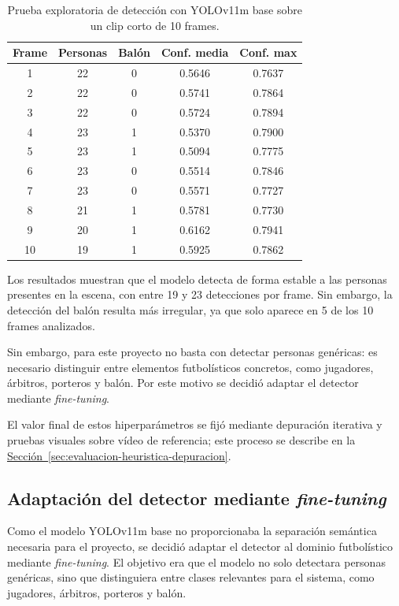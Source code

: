 \begin{table}[H]
	\centering
	\begin{tabular}{c|c|c|c|c}
		\textbf{Frame} & \textbf{Personas} & \textbf{Balón} & \textbf{Conf. media} & \textbf{Conf. max} \\
		\hline\hline
		1 & 22 & 0 & 0.5646 & 0.7637 \\
		2 & 22 & 0 & 0.5741 & 0.7864 \\
		3 & 22 & 0 & 0.5724 & 0.7894 \\
		4 & 23 & 1 & 0.5370 & 0.7900 \\
		5 & 23 & 1 & 0.5094 & 0.7775 \\
		6 & 23 & 0 & 0.5514 & 0.7846 \\
		7 & 23 & 0 & 0.5571 & 0.7727 \\
		8 & 21 & 1 & 0.5781 & 0.7730 \\
		9 & 20 & 1 & 0.6162 & 0.7941 \\
		10 & 19 & 1 & 0.5925 & 0.7862 \\
		\hline
	\end{tabular}
	\caption[Prueba exploratoria de detección con YOLOv11m]{Prueba exploratoria de detección con YOLOv11m base sobre un clip corto de 10 frames.}
	\label{tab:yolo11mBaseFrame}
\end{table}

Los resultados muestran que el modelo detecta de forma estable a las personas presentes en la escena, con entre 19 y 23 detecciones por frame. Sin embargo, la detección del balón resulta más irregular, ya que solo aparece en 5 de los 10 frames analizados.

Sin embargo, para este proyecto no basta con detectar personas genéricas: es necesario distinguir entre elementos futbolísticos concretos, como jugadores, árbitros, porteros y balón. Por este motivo se decidió adaptar el detector mediante \textit{fine-tuning}.

El valor final de estos hiperparámetros se fijó mediante depuración iterativa y pruebas visuales sobre vídeo de referencia; este proceso se describe en la \hyperref[sec:evaluacion-heuristica-depuracion]{Sección~\ref*{sec:evaluacion-heuristica-depuracion}}.

\subsection{Adaptación del detector mediante \textit{fine-tuning}}
Como el modelo YOLOv11m base no proporcionaba la separación semántica necesaria para el proyecto, se decidió adaptar el detector al dominio futbolístico mediante \textit{fine-tuning}. El objetivo era que el modelo no solo detectara personas genéricas, sino que distinguiera entre clases relevantes para el sistema, como jugadores, árbitros, porteros y balón.


